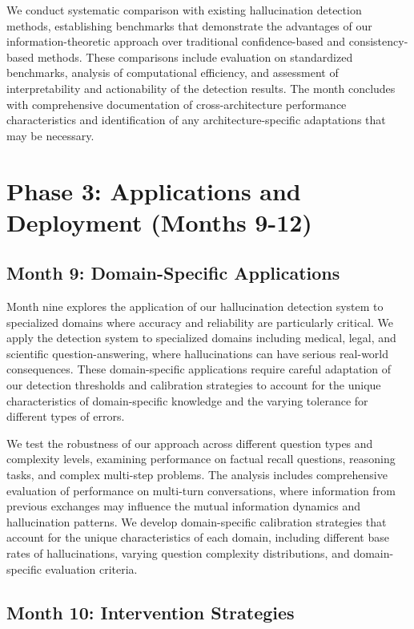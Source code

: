\documentclass[11pt, oneside]{book}
\theoremstyle{plain}
\theoremstyle{definition}
\theoremstyle{remark}
\begin{document}
We conduct systematic comparison with existing hallucination detection methods, establishing benchmarks that demonstrate the advantages of our information-theoretic approach over traditional confidence-based and consistency-based methods. These comparisons include evaluation on standardized benchmarks, analysis of computational efficiency, and assessment of interpretability and actionability of the detection results. The month concludes with comprehensive documentation of cross-architecture performance characteristics and identification of any architecture-specific adaptations that may be necessary.

\section{Phase 3: Applications and Deployment (Months 9-12)}

\subsection{Month 9: Domain-Specific Applications}

Month nine explores the application of our hallucination detection system to specialized domains where accuracy and reliability are particularly critical. We apply the detection system to specialized domains including medical, legal, and scientific question-answering, where hallucinations can have serious real-world consequences. These domain-specific applications require careful adaptation of our detection thresholds and calibration strategies to account for the unique characteristics of domain-specific knowledge and the varying tolerance for different types of errors.

We test the robustness of our approach across different question types and complexity levels, examining performance on factual recall questions, reasoning tasks, and complex multi-step problems. The analysis includes comprehensive evaluation of performance on multi-turn conversations, where information from previous exchanges may influence the mutual information dynamics and hallucination patterns. We develop domain-specific calibration strategies that account for the unique characteristics of each domain, including different base rates of hallucinations, varying question complexity distributions, and domain-specific evaluation criteria.

\subsection{Month 10: Intervention Strategies}
\end{document}

